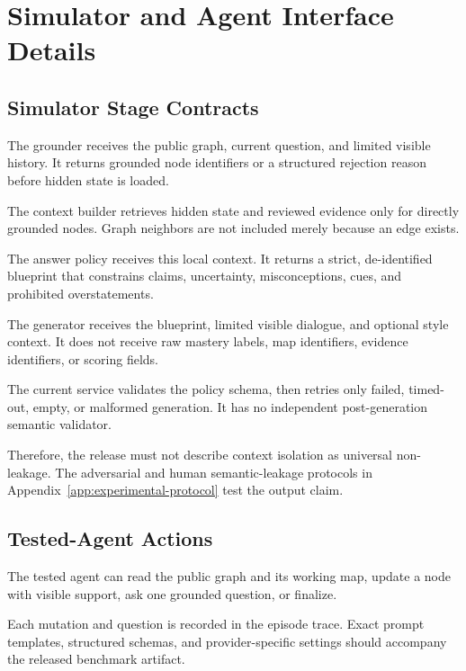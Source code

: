 \section{Simulator and Agent Interface Details}
\label{app:interfaces}

\subsection{Simulator Stage Contracts}

The \sagesim grounder receives the public graph, current question, and limited visible history. It
returns grounded node identifiers or a structured rejection reason before hidden state is loaded.

The context builder retrieves hidden state and reviewed evidence only for directly grounded nodes.
Graph neighbors are not included merely because an edge exists.

The answer policy receives this local context. It returns a strict, de-identified blueprint that
constrains claims, uncertainty, misconceptions, cues, and prohibited overstatements.

The generator receives the blueprint, limited visible dialogue, and optional style context. It does not
receive raw mastery labels, map identifiers, evidence identifiers, or scoring fields.

The current service validates the policy schema, then retries only failed, timed-out, empty, or
malformed generation. It has no independent post-generation semantic validator.

Therefore, the release must not describe context isolation as universal non-leakage. The adversarial
and human semantic-leakage protocols in Appendix~\ref{app:experimental-protocol} test the output claim.

\subsection{Tested-Agent Actions}

The tested agent can read the public graph and its working map, update a node with visible support, ask one grounded question, or finalize.

Each mutation and question is recorded in the episode trace. Exact prompt templates, structured schemas, and provider-specific settings should accompany the released benchmark artifact.
